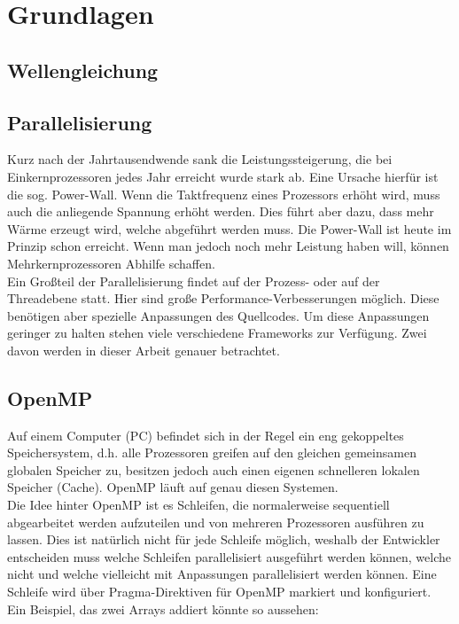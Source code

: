 
\section{Grundlagen}

\subsection{Wellengleichung}

\subsection{Parallelisierung}
Kurz nach der Jahrtausendwende sank die Leistungssteigerung, die bei Einkernprozessoren jedes Jahr erreicht wurde stark ab. Eine Ursache hierfür ist die sog. Power-Wall. Wenn die Taktfrequenz eines Prozessors erhöht wird, muss auch die anliegende Spannung erhöht werden. Dies führt aber dazu, dass mehr Wärme erzeugt wird, welche abgeführt werden muss. Die Power-Wall ist heute im Prinzip schon erreicht. Wenn man jedoch noch mehr Leistung haben will, können Mehrkernprozessoren Abhilfe schaffen.\\
Ein Großteil der Parallelisierung findet auf der Prozess- oder auf der Threadebene statt. Hier sind große Performance-Verbesserungen möglich. Diese benötigen aber spezielle Anpassungen des Quellcodes. Um diese Anpassungen geringer zu halten stehen viele verschiedene Frameworks zur Verfügung. Zwei davon werden in dieser Arbeit genauer betrachtet.

\subsection{OpenMP}
Auf einem Computer (PC) befindet sich in der Regel ein eng gekoppeltes Speichersystem, d.h. alle Prozessoren greifen auf den gleichen gemeinsamen globalen Speicher zu, besitzen jedoch auch einen eigenen schnelleren lokalen Speicher (Cache). OpenMP läuft auf genau diesen Systemen.\\
Die Idee hinter OpenMP ist es Schleifen, die normalerweise sequentiell abgearbeitet werden aufzuteilen und von mehreren Prozessoren ausführen zu lassen. Dies ist natürlich nicht für jede Schleife möglich, weshalb der Entwickler entscheiden muss welche Schleifen parallelisiert ausgeführt werden können, welche nicht und welche vielleicht mit Anpassungen parallelisiert werden können. Eine Schleife wird über Pragma-Direktiven für OpenMP markiert und konfiguriert. Ein Beispiel, das zwei Arrays addiert könnte so aussehen:

